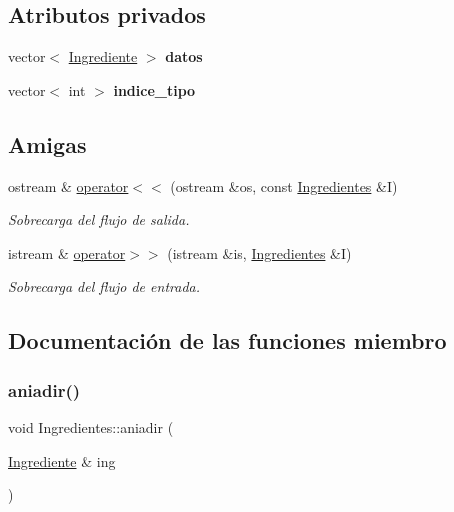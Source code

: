 \subsection*{Atributos privados}
\begin{DoxyCompactItemize}
\item 
\mbox{\label{classIngredientes_a0d179d0ffec925fda2a931e022c0f87c}} 
vector$<$ \hyperlink{classIngrediente}{Ingrediente} $>$ {\bfseries datos}
\item 
\mbox{\label{classIngredientes_a0702f3e37510eada2125dbb5735e7604}} 
vector$<$ int $>$ {\bfseries indice\+\_\+tipo}
\end{DoxyCompactItemize}
\subsection*{Amigas}
\begin{DoxyCompactItemize}
\item 
ostream \& \hyperlink{classIngredientes_a933ab431055a2a381448533ff8aa3299}{operator$<$$<$} (ostream \&os, const \hyperlink{classIngredientes}{Ingredientes} \&I)
\begin{DoxyCompactList}\small\item\em Sobrecarga del flujo de salida. \end{DoxyCompactList}\item 
istream \& \hyperlink{classIngredientes_afa2cabeefdee6cf26890ffd55bb3a7f3}{operator$>$$>$} (istream \&is, \hyperlink{classIngredientes}{Ingredientes} \&I)
\begin{DoxyCompactList}\small\item\em Sobrecarga del flujo de entrada. \end{DoxyCompactList}\end{DoxyCompactItemize}


\subsection{Documentación de las funciones miembro}
\mbox{\label{classIngredientes_a05c66a6f99e091939e09ee79cd11402a}} 
\subsubsection{\texorpdfstring{aniadir()}{aniadir()}}
{\footnotesize\ttfamily void Ingredientes\+::aniadir (\begin{DoxyParamCaption}\item[{\hyperlink{classIngrediente}{Ingrediente} \&}]{ing }\end{DoxyParamCaption})}



